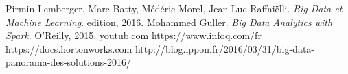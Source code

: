 


\begin{thebibliography}{ABC}	
     Pirmin Lemberger, Marc Batty, Médéric Morel, Jean-Luc Raffaiëlli. \emph{Big Data et Machine Learning}. edition, 2016.
     Mohammed Guller. \emph{Big Data Analytics with Spark}. O'Reilly, 2015.
      youtub.com
       https://www.infoq.com/fr
      https://docs.hortonworks.com 
       http://blog.ippon.fr/2016/03/31/big-data-panorama-des-solutions-2016/
\end{thebibliography}

